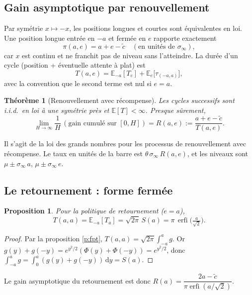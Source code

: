 \documentclass[11pt,a4paper]{article}
\newtheorem{proposition}{Proposition}
\newtheorem{theoreme}{Théorème}
\theoremstyle{definition}
\theoremstyle{remark}
\newcommand{\E}{\mathbb{E}}
\newcommand{\dd}{\mathrm{d}}
\newcommand{\sinf}{\sigma_\infty}
\DeclareMathOperator{\erfi}{erfi}
\begin{document}
\subsection{Gain asymptotique par renouvellement}

Par symétrie $x\mapsto -x$, les positions longues et courtes sont équivalentes en loi. Une position longue
entrée en $-a$ et fermée en $e$ rapporte exactement
\begin{equation}\label{eq:profit}
\pi(a,e)=a+e-\tilde c \quad(\text{en unités de }\sinf),
\end{equation}
car $x$ est continu et ne franchit pas de niveau sans l'atteindre. La durée d'un cycle (position + éventuelle attente à plat) est
\begin{equation}\label{eq:cycle}
T(a,e)=\E_{-a}[T_e]+\E_e\big[\tau_{(-a,a)}\big],
\end{equation}
avec la convention que le second terme est nul si $e=a$.

\begin{theoreme}[Renouvellement avec récompense]\label{t:renew}
Les cycles successifs sont i.i.d.\ en loi à une symétrie près et $\E[T]<\infty$. Presque sûrement,
\[
\lim_{H\to\infty}\frac{1}{H}\,(\text{gain cumulé sur }[0,H])=R(a,e):=\frac{a+e-\tilde c}{T(a,e)} .
\]
\end{theoreme}
Il s'agit de la loi des grands nombres pour les processus de renouvellement avec récompense. Le taux
en unités de la barre est $\theta\,\sinf\,R(a,e)$, et les niveaux sont $\mu\pm\sinf\,a$, $\mu\pm\sinf\,e$.

\subsection{Le retournement : forme fermée}

\begin{proposition}\label{p:flip}
Pour la politique de retournement ($e=a$),
\[
T(a,a)=\E_{-a}[T_a]=\sqrt{2\pi}\,S(a)=\pi\,\erfi\!\Big(\tfrac{a}{\sqrt2}\Big).
\]
\end{proposition}
\begin{proof}
Par la proposition \ref{p:fpt}, $T(a,a)=\sqrt{2\pi}\int_{-a}^{a}g$. Or $g(y)+g(-y)=e^{y^2/2}(\Phi(y)+\Phi(-y))=e^{y^2/2}$, donc
$\int_{-a}^{a}g=\int_0^a (g(y)+g(-y))\,\dd y=S(a)$.
\end{proof}

Le gain asymptotique du retournement est donc $R(a)=\dfrac{2a-\tilde c}{\pi\erfi(a/\sqrt2)}$.
\end{document}

